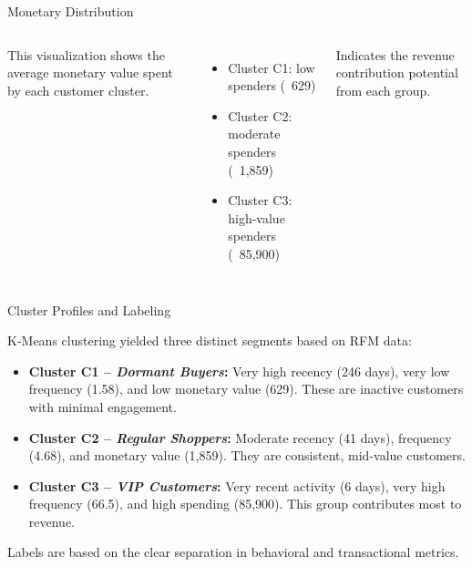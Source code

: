 \documentclass[aspectratio=169, table]{beamer}
\begin{document}
\begin{frame}{Monetary Distribution}
	\vspace{20pt}
	\begin{columns}[c]
		\small
		This visualization shows the average monetary value spent by each customer cluster.  
		\begin{itemize}
			\item Cluster C1: low spenders (~629)  
			\item Cluster C2: moderate spenders (~1,859)  
			\item Cluster C3: high-value spenders (~85,900)  
		\end{itemize}
		Indicates the revenue contribution potential from each group.
		
		\centering
	\end{columns}
\end{frame}


\begin{frame}{Cluster Profiles and Labeling}
\vspace{20pt}

K-Means clustering yielded three distinct segments based on RFM data:

\begin{itemize}
\item \textbf{Cluster C1 – \textit{Dormant Buyers}:} Very high recency (246 days), very low frequency (1.58), and low monetary value (629). These are inactive customers with minimal engagement.
\item \textbf{Cluster C2 – \textit{Regular Shoppers}:} Moderate recency (41 days), frequency (4.68), and monetary value (1,859). They are consistent, mid-value customers.
\item \textbf{Cluster C3 – \textit{VIP Customers}:} Very recent activity (6 days), very high frequency (66.5), and high spending (85,900). This group contributes most to revenue.
\end{itemize}

Labels are based on the clear separation in behavioral and transactional metrics.
\end{frame}
\end{document}
